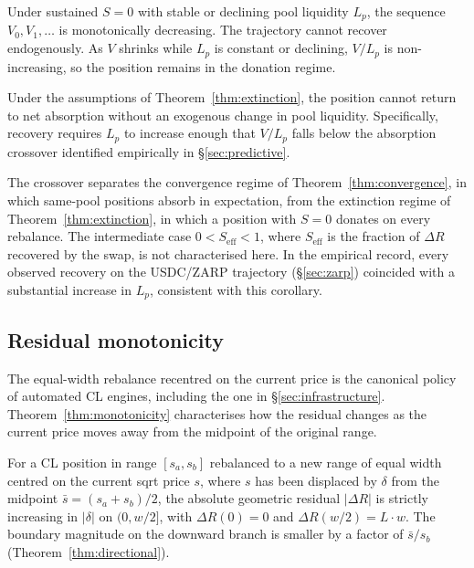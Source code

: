 \documentclass{manuscript}
\begin{document}
\noindent Under sustained $S = 0$ with stable or declining pool liquidity $L_p$, the sequence $V_0, V_1, \ldots$ is monotonically decreasing. The trajectory cannot recover endogenously. As $V$ shrinks while $L_p$ is constant or declining, $V/L_p$ is non-increasing, so the position remains in the donation regime.

\begin{corollary}\label{cor:irreversibility}
Under the assumptions of Theorem~\ref{thm:extinction}, the position cannot return to net absorption without an exogenous change in pool liquidity. Specifically, recovery requires $L_p$ to increase enough that $V/L_p$ falls below the absorption crossover identified empirically in \S\ref{sec:predictive}.
\end{corollary}

\noindent The crossover separates the convergence regime of Theorem~\ref{thm:convergence}, in which same-pool positions absorb in expectation, from the extinction regime of Theorem~\ref{thm:extinction}, in which a position with $S = 0$ donates on every rebalance. The intermediate case $0 < S_{\text{eff}} < 1$, where $S_{\text{eff}}$ is the fraction of $\Delta R$ recovered by the swap, is not characterised here. In the empirical record, every observed recovery on the USDC/ZARP trajectory (\S\ref{sec:zarp}) coincided with a substantial increase in $L_p$, consistent with this corollary.

\subsection{Residual monotonicity}\label{sec:monotonicity}

The equal-width rebalance recentred on the current price is the canonical policy of automated CL engines, including the one in \S\ref{sec:infrastructure}. Theorem~\ref{thm:monotonicity} characterises how the residual changes as the current price moves away from the midpoint of the original range.

\begin{theorem}\label{thm:monotonicity}
For a CL position in range $[s_a, s_b]$ rebalanced to a new range of equal width centred on the current sqrt price $s$, where $s$ has been displaced by $\delta$ from the midpoint $\bar{s} = (s_a + s_b)/2$, the absolute geometric residual $|\Delta R|$ is strictly increasing in $|\delta|$ on $(0, w/2]$, with $\Delta R(0) = 0$ and $\Delta R(w/2) = L \cdot w$. The boundary magnitude on the downward branch is smaller by a factor of $\bar{s}/s_b$ (Theorem~\ref{thm:directional}).
\end{theorem}
\end{document}
